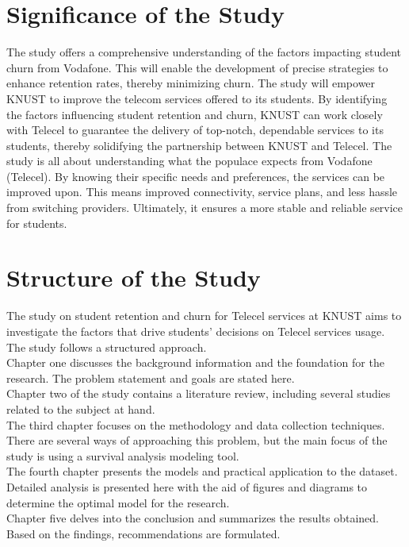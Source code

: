 \documentclass[doublespacing]{report} [12px]%
\begin{document}
\section{Significance of the Study}

The study offers a comprehensive understanding of the factors impacting student churn from Vodafone. This will enable the development of precise strategies to enhance retention rates, thereby minimizing churn. The study will empower KNUST to improve the telecom services offered to its students. By identifying the factors influencing student retention and churn, KNUST can work closely with Telecel to guarantee the delivery of top-notch, dependable services to its students, thereby solidifying the partnership between KNUST and Telecel. The study is all about understanding what the populace expects from Vodafone (Telecel). By knowing their specific needs and preferences, the services can be improved upon. This means improved connectivity, service plans, and less hassle from switching providers. Ultimately, it ensures a more stable and reliable service for students.

\section{Structure of the Study}

The study on student retention and churn for Telecel services at KNUST aims to investigate the factors that drive students' decisions on Telecel services usage. The study follows a structured approach.
\\Chapter one discusses the background information and the foundation for the research. The problem statement and goals are stated here.
\\Chapter two of the study contains a literature review, including several studies related to the subject at hand.
\\The third chapter focuses on the methodology and data collection techniques. There are several ways of approaching this problem, but the main focus of the study is using a survival analysis modeling tool.
\\The fourth chapter presents the models and practical application to the dataset. Detailed analysis is presented here with the aid of figures and diagrams to determine the optimal model for the research.
\\Chapter five delves into the conclusion and summarizes the results obtained. Based on the findings, recommendations are formulated.
\end{document}
